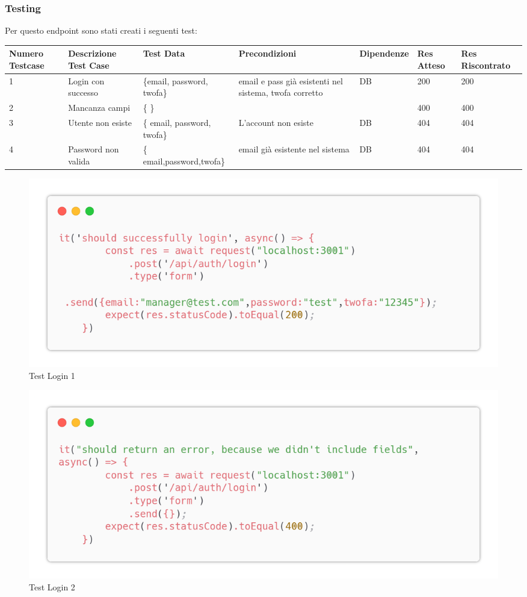 \documentclass{report}
\begin{document}
\subsubsection*{Testing}
Per questo endpoint sono stati creati i seguenti test:
\begin{center} %
	\centering
	\begin{tabular}{ |p{1cm}|p{2cm}|p{2cm}|p{2cm}|p{2cm}|p{1cm}|p{1cm}| }
		\hline
		Numero Testcase & Descrizione Test Case & Test Data                   & Precondizioni                                          & Dipendenze & Res Atteso & Res Riscontrato \\
		\hline
		1               & Login con successo    & \{email, password, twofa\}  & email e pass già esistenti nel sistema, twofa corretto & DB         & 200        & 200             \\
		\hline
		2               & Mancanza campi        & \{ \}                       &                                                        &            & 400        & 400             \\
		\hline
		3               & Utente non esiste     & \{ email, password, twofa\} & L'account non esiste                                   & DB         & 404        & 404             \\
		\hline
		4               & Password non valida   & \{ email,password,twofa\}   & email già esistente nel sistema                        & DB         & 404        & 404             \\
		\hline
	\end{tabular}
\end{center}
\begin{figure}[H]
	\centering\includegraphics[width=1\textwidth]{images/microservizio-autenticazione/tests/login_test_1.png}
	\caption{Test Login 1}
\end{figure}
\begin{figure}[H]
	\centering\includegraphics[width=1\textwidth]{images/microservizio-autenticazione/tests/login_test_2.png}
	\caption{Test Login 2}
\end{figure}
\end{document}
